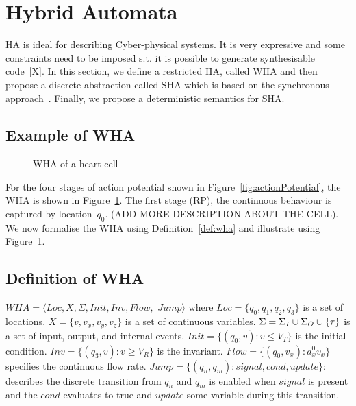 \section{Hybrid Automata}
\label{sec:HA}



\acf{HA} is ideal for describing 
Cyber-physical systems. It is very expressive and
some constraints need to be imposed s.t. it is possible to  
generate synthesisable  code~[X]. In this section, 
we define a restricted \ac{HA}, called 
\acf{WHA} and then propose a discrete abstraction
called \acf{SHA} which is based on the
synchronous approach~\cite{benveniste03}.
Finally, we propose a deterministic semantics for \ac{SHA}.



\subsection{Example of \acf{WHA} }

\begin{figure}
\centering

\caption{\acf{WHA} of a heart cell \label{fig:heartCellHA}}
\end{figure}


For the four stages of action potential  shown in Figure~\ref{fig:actionPotential}, the \ac{WHA} is
shown in Figure~\ref{fig:heartCellHA}.
The first stage (\ac{RP}), the continuous behaviour is captured 
by location~$q_0$. (ADD MORE DESCRIPTION ABOUT THE CELL).
We now formalise
the \ac{WHA} using Definition~\ref{def:wha} and illustrate using Figure~\ref{fig:heartCellHA}.

\subsection{Definition of \acf{WHA}}

\begin{definition}
	$WHA = \langle Loc, X, \Sigma, Init, Inv, Flow,$ $ Jump \rangle$ where
	$Loc=\{q_0,q_1,q_2,q_3\}$ is a set of locations.
	$X=\{v,v_x,v_y,v_z\}$ is a set of continuous variables.
	$\Sigma=\Sigma_I \cup \Sigma_O \cup \{\tau\}$ is a set of
	 input, output, and internal events.
	$Init=\{(q_0,v): v\leq V_T\}$ is the initial condition.
	$Inv=\{(q_3,v): v\geq V_R\}$ is the invariant.
	$Flow=\{(q_0,v_x): a_{x}^{0} v_x\}$ specifies the continuous flow rate.
	$Jump=\{(q_n, q_m): signal, cond, update\}$: describes the discrete
	transition from $q_n$ and $q_m$ is enabled when $signal$ is 
	present and the $cond$ evaluates to true and $update$
	some variable during this transition.
	
	
	\label{def:wha}
\end{definition}

